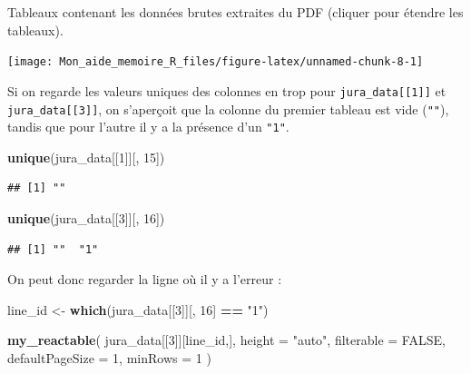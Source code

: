 \documentclass[
  french,
]{book}
\newenvironment{Shaded}{\begin{snugshade}}{\end{snugshade}}
\newcommand{\DataTypeTok}[1]{\textcolor[rgb]{0.13,0.29,0.53}{#1}}
\newcommand{\DecValTok}[1]{\textcolor[rgb]{0.00,0.00,0.81}{#1}}
\newcommand{\KeywordTok}[1]{\textcolor[rgb]{0.13,0.29,0.53}{\textbf{#1}}}
\newcommand{\NormalTok}[1]{#1}
\newcommand{\OperatorTok}[1]{\textcolor[rgb]{0.81,0.36,0.00}{\textbf{#1}}}
\newcommand{\OtherTok}[1]{\textcolor[rgb]{0.56,0.35,0.01}{#1}}
\newcommand{\StringTok}[1]{\textcolor[rgb]{0.31,0.60,0.02}{#1}}
\begin{document}
\label{tab:juradata} Tableaux contenant les données brutes extraites du PDF (cliquer pour étendre les tableaux).

\begin{center}\texttt{[image: Mon\_aide\_memoire\_R\_files/figure-latex/unnamed-chunk-8-1]} \end{center}

Si on regarde les valeurs uniques des colonnes en trop pour \texttt{jura\_data{[}{[}1{]}{]}} et
\texttt{jura\_data{[}{[}3{]}{]}}, on s'aperçoit que la colonne du premier tableau est vide
(\texttt{""}), tandis que pour l'autre il y a la présence d'un \texttt{"1"}.

\begin{Shaded}
\begin{Highlighting}[]
\KeywordTok{unique}\NormalTok{(jura\_data[[}\DecValTok{1}\NormalTok{]][, }\DecValTok{15}\NormalTok{])}
\end{Highlighting}
\end{Shaded}

\begin{verbatim}
## [1] ""
\end{verbatim}

\begin{Shaded}
\begin{Highlighting}[]
\KeywordTok{unique}\NormalTok{(jura\_data[[}\DecValTok{3}\NormalTok{]][, }\DecValTok{16}\NormalTok{])}
\end{Highlighting}
\end{Shaded}

\begin{verbatim}
## [1] ""  "1"
\end{verbatim}

On peut donc regarder la ligne où il y a l'erreur :

\begin{Shaded}
\begin{Highlighting}[]
\NormalTok{line\_id \textless{}{-}}\StringTok{ }\KeywordTok{which}\NormalTok{(jura\_data[[}\DecValTok{3}\NormalTok{]][, }\DecValTok{16}\NormalTok{] }\OperatorTok{==}\StringTok{ "1"}\NormalTok{)}

\KeywordTok{my\_reactable}\NormalTok{(}
\NormalTok{  jura\_data[[}\DecValTok{3}\NormalTok{]][line\_id,],}
  \DataTypeTok{height =} \StringTok{"auto"}\NormalTok{,}
  \DataTypeTok{filterable =} \OtherTok{FALSE}\NormalTok{,}
  \DataTypeTok{defaultPageSize =} \DecValTok{1}\NormalTok{, }
  \DataTypeTok{minRows =} \DecValTok{1}
\NormalTok{)}
\end{Highlighting}
\end{Shaded}
\end{document}
